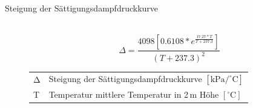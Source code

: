 \begin{description}
\item[Steigung der Sättigungsdampfdruckkurve]~
\begin{equation}
\label{eq:steigung}
\Delta=\frac{4098\left[0.6108*e^{\frac{17.27*T}{T+237.3}}\right]}{\left(T+237.3\right)^2}
\end{equation}
\begin{table}[H]
\centering
\begin{tabular}{ll}
$\mathrm{\Delta}$ & Steigung der Sättigungsdampfdruckkurve $\mathrm{[kPa/^{\circ}C]}$\\
T & Temperatur mittlere Temperatur in 2\,m Höhe $\mathrm{[^{\circ}C]}$\\
\end{tabular}
\end{table}


\end{description}

